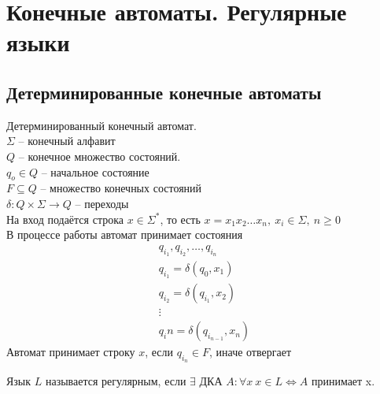 \section {Конечные автоматы. Регулярные языки}
\subsection{Детерминированные конечные автоматы}
\begin{conj}
    Детерминированный конечный автомат.\\
    $\Sigma$ -- конечный алфавит\\
    $Q$ -- конечное множество состояний.\\
    $q_o \in Q$ -- начальное состояние\\
    $F \subseteq Q$ -- множество конечных состояний\\
    $\delta : Q \times \Sigma \to Q$ -- переходы\\
    На вход подаётся строка $x \in \Sigma^*$, то есть $x = x_1x_2\dots x_n,\ x_i \in \Sigma,\ n \geq 0$\\
    В процессе работы автомат принимает состояния
    \begin{gather*}
        q_{i_1}, q_{i_2}, \dots, q_{i_n} \\
        q_{i_1} = \delta(q_0, x_1) \\
        q_{i_2} = \delta(q_{i_1}, x_2) \\
        \vdots \\
        q_i{n} = \delta(q_{i_{n-1}}, x_n) 
    \end{gather*}
    Автомат принимает строку $x$, если $q_{i_n} \in F$, иначе отвергает
\end{conj}

\begin{conj}
    Язык $L$ называется регулярным, если $\exists$ ДКА $A : \forall x\ x \in L \Leftrightarrow A$ принимает x.
\end{conj}

